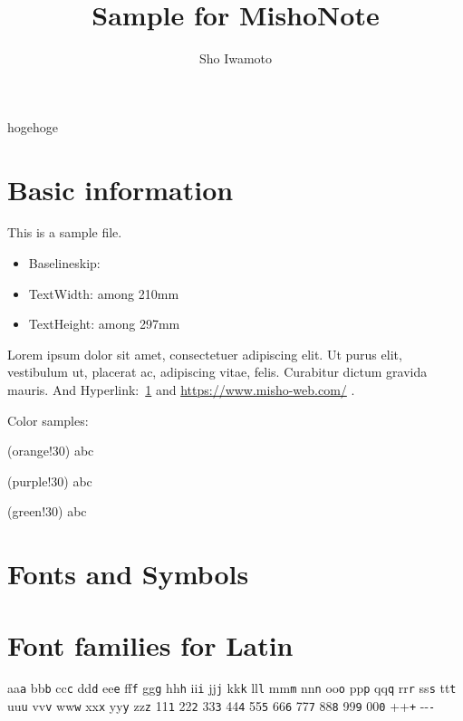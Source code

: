 \documentclass[11pt,pdf0]{MishoNote}
\title{Sample for MishoNote}
\author{Sho Iwamoto}
\begin{document}
\maketitle
hogehoge
\endmaketitle

\section{Basic information}
\label{cha:basic-information}

This is a sample file.

\begin{itemize}
 \item Baselineskip: \ShowLength{\baselineskip}
 \item TextWidth: \ShowLength{\textwidth} among 210mm
 \item TextHeight: \ShowLength{\textheight} among 297mm
\end{itemize}

\makeatletter\ShowLength{\@total@headsep}\makeatother

Lorem ipsum dolor sit amet, consectetuer adipiscing elit. Ut purus elit, vestibulum ut, placerat ac, adipiscing vitae, felis. Curabitur dictum gravida mauris.
And Hyperlink:~\ref{cha:basic-information} and \url{https://www.misho-web.com/} \cite{hogehoge}.

Color samples: 

(orange!30) \colorbox{pLightOrange!30}{abc}

(purple!30) \colorbox{pLightPurple!30}{abc}

(green!30) \colorbox{pLightGreen!30}{abc}

\section{Fonts and Symbols}

\section{Font families for Latin}

\def\w#1{#1\textsf{#1}\texttt{#1} }
\w a\w b\w c\w d\w e\w f\w g\w h\w i\w j\w k\w l\w m\w n\w o\w p\w q\w r\w s\w t\w u\w v\w w\w x\w y\w z\w 1\w 2\w 3\w 4\w 5\w 6\w 7\w 8\w 9\w0 \w+\w-
\end{document}
